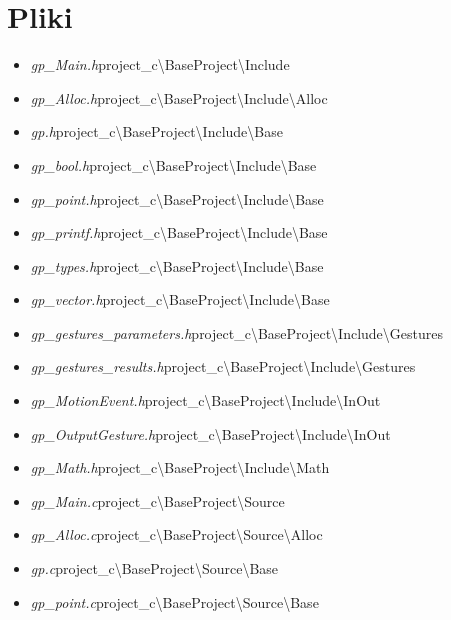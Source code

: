 \section{Pliki}
\begin{itemize}
\item \textit{gp_Main.h}\quad project_c\textbackslash BaseProject\textbackslash Include
\item \textit{gp_Alloc.h}\quad project_c\textbackslash BaseProject\textbackslash Include\textbackslash Alloc
\item \textit{gp.h}\quad project_c\textbackslash BaseProject\textbackslash Include\textbackslash Base
\item \textit{gp_bool.h}\quad project_c\textbackslash BaseProject\textbackslash Include\textbackslash Base
\item \textit{gp_point.h}\quad project_c\textbackslash BaseProject\textbackslash Include\textbackslash Base
\item \textit{gp_printf.h}\quad project_c\textbackslash BaseProject\textbackslash Include\textbackslash Base
\item \textit{gp_types.h}\quad project_c\textbackslash BaseProject\textbackslash Include\textbackslash Base
\item \textit{gp_vector.h}\quad project_c\textbackslash BaseProject\textbackslash Include\textbackslash Base
\item \textit{gp_gestures_parameters.h}\quad project_c\textbackslash BaseProject\textbackslash Include\textbackslash Gestures
\item \textit{gp_gestures_results.h}\quad project_c\textbackslash BaseProject\textbackslash Include\textbackslash Gestures
\item \textit{gp_MotionEvent.h}\quad project_c\textbackslash BaseProject\textbackslash Include\textbackslash InOut
\item \textit{gp_OutputGesture.h}\quad project_c\textbackslash BaseProject\textbackslash Include\textbackslash InOut
\item \textit{gp_Math.h}\quad project_c\textbackslash BaseProject\textbackslash Include\textbackslash Math
\item \textit{gp_Main.c}\quad project_c\textbackslash BaseProject\textbackslash Source
\item \textit{gp_Alloc.c}\quad project_c\textbackslash BaseProject\textbackslash Source\textbackslash Alloc
\item \textit{gp.c}\quad project_c\textbackslash BaseProject\textbackslash Source\textbackslash Base
\item \textit{gp_point.c}\quad project_c\textbackslash BaseProject\textbackslash Source\textbackslash Base

\end{itemize}
